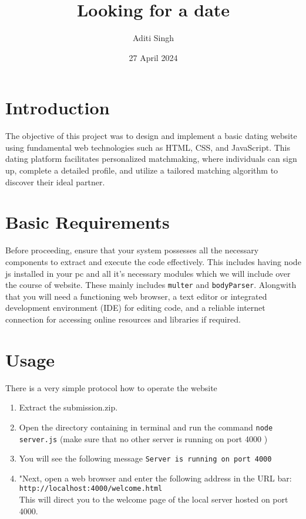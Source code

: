 \documentclass{article}
\title{Looking for a date}
\author{Aditi Singh}
\date{27 April 2024}
\begin{document}
\maketitle
\tableofcontents
\clearpage
\newpage

\section{Introduction}
The objective of this project was to design and implement a basic dating website using fundamental web technologies such as HTML, CSS, and JavaScript. This dating platform facilitates personalized matchmaking, where individuals can sign up, complete a detailed profile, and utilize a tailored matching algorithm to discover their ideal partner.
\section{Basic Requirements}
Before proceeding, ensure that your system possesses all the necessary components to extract and execute the code effectively. This includes having node js installed in your pc and all it's necessary modules which we will include over the course of website. These mainly includes \texttt{multer} and \texttt{bodyParser}. Alongwith that you will need  a functioning web browser, a text editor or integrated development environment (IDE) for editing code, and a reliable internet connection for accessing online resources and libraries if required.
\section{Usage}
There is a very simple protocol how to operate the website
\begin{enumerate}
    \item Extract the submission.zip.
    \item Open the directory containing in terminal and run the command \texttt{node server.js} (make sure that no other server is running on port 4000 )
    \item You will see the following message \texttt{Server is running on port 4000}
    \item "Next, open a web browser and enter the following address in the URL bar: \\    \texttt{http://localhost:4000/welcome.html} \\
    This will direct you to the welcome page of the local server hosted on port 4000.
    
\end{enumerate}
\end{document}
